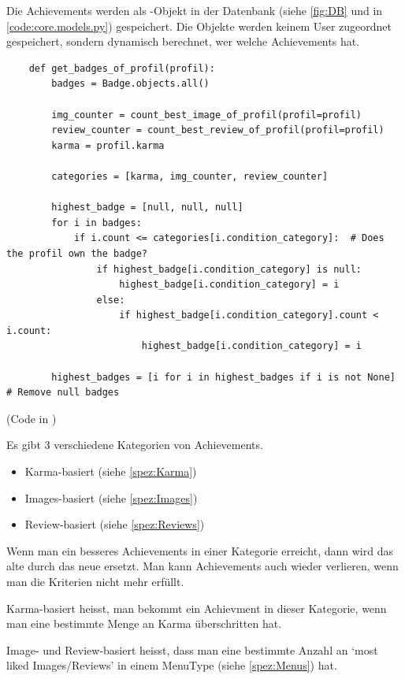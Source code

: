 Die Achievements werden als -Objekt in der Datenbank (siehe \ref{fig:DB} und in
\ref{code:core.models.py}) gespeichert. Die Objekte werden keinem User
zugeordnet gespeichert, sondern dynamisch berechnet, wer welche Achievements
hat.

\begin{lstlisting}
    def get_badges_of_profil(profil):
        badges = Badge.objects.all()
 
        img_counter = count_best_image_of_profil(profil=profil)
        review_counter = count_best_review_of_profil(profil=profil)
        karma = profil.karma

        categories = [karma, img_counter, review_counter]

        highest_badge = [null, null, null]
        for i in badges:
            if i.count <= categories[i.condition_category]:  # Does the profil own the badge?
                if highest_badge[i.condition_category] is null:
                    highest_badge[i.condition_category] = i
                else:
                    if highest_badge[i.condition_category].count < i.count:
                        highest_badge[i.condition_category] = i
        
        highest_badges = [i for i in highest_badges if i is not None]  # Remove null badges
\end{lstlisting}

(Code in )

Es gibt 3 verschiedene Kategorien von Achievements.
\begin{itemize}
    \item Karma-basiert (siehe \ref{spez:Karma})
    \item Images-basiert (siehe \ref{spez:Images})
    \item Review-basiert (siehe \ref{spez:Reviews})
\end{itemize}

Wenn man ein besseres Achievements in einer Kategorie erreicht, dann wird das
alte durch das neue ersetzt. Man kann Achievements auch wieder verlieren, wenn
man die Kriterien nicht mehr erfüllt.

Karma-basiert heisst, man bekommt ein Achievment in dieser Kategorie, wenn man
eine bestimmte Menge an Karma überschritten hat.

Image- und Review-basiert heisst, dass man eine bestimmte Anzahl an `most liked
Images/Reviews' in einem MenuType (siehe \ref{spez:Menus}) hat.

